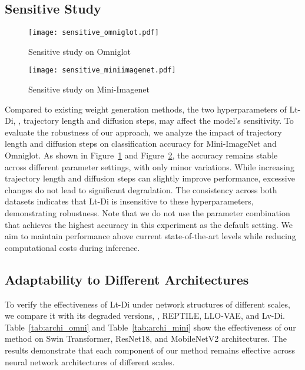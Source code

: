 \subsection{Sensitive Study}
\begin{figure}[t]
    \centering
    \texttt{[image: sensitive\_omniglot.pdf]}
    \caption{Sensitive study on Omniglot}
    \label{fig:sen_omni}
\end{figure}
\begin{figure}[t]
    \centering
    \texttt{[image: sensitive\_miniimagenet.pdf]}
    \caption{Sensitive study on Mini-Imagenet}
    \label{fig:sen_mini}
\end{figure}
Compared to existing weight generation methods, the two hyperparameters of Lt-Di, \ie, trajectory length and diffusion steps, may affect the model's sensitivity. To evaluate the robustness of our approach, we analyze the impact of trajectory length and diffusion steps on classification accuracy for Mini-ImageNet and Omniglot. As shown in Figure~\ref{fig:sen_omni} and Figure~\ref{fig:sen_mini}, the accuracy remains stable across different parameter settings, with only minor variations. While increasing trajectory length and diffusion steps can slightly improve performance, excessive changes do not lead to significant degradation. The consistency across both datasets indicates that Lt-Di is insensitive to these hyperparameters, demonstrating robustness. Note that we do not use the parameter combination that achieves the highest accuracy in this experiment as the default setting. We aim to maintain performance above current state-of-the-art levels while reducing computational costs during inference.

\subsection{Adaptability to Different Architectures}
To verify the effectiveness of Lt-Di under network structures of different scales, we compare it with its degraded versions, \ie, REPTILE, LLO-VAE, and Lv-Di. Table~\ref{tab:archi_omni} and Table~\ref{tab:archi_mini} show the effectiveness of our method on Swin Transformer, ResNet18, and MobileNetV2 architectures. The results demonstrate that each component of our method remains effective across neural network architectures of different scales.


